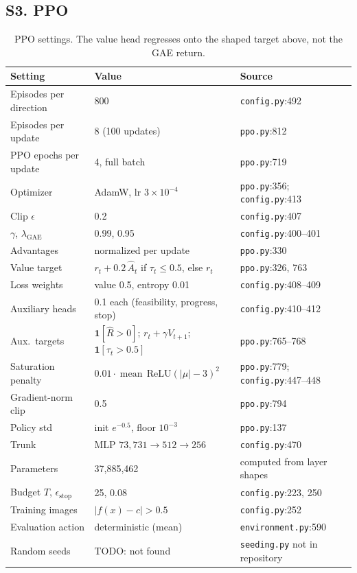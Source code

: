 \subsection*{S3. PPO}

\begin{table}[t]
\centering
\small
\begin{tabular}{@{}lll@{}}
\toprule
Setting & Value & Source \\
\midrule
Episodes per direction & 800 & \texttt{config.py}:492 \\
Episodes per update & 8 (100 updates) & \texttt{ppo.py}:812 \\
PPO epochs per update & 4, full batch & \texttt{ppo.py}:719 \\
Optimizer & AdamW, lr $3\times10^{-4}$ & \texttt{ppo.py}:356; \texttt{config.py}:413 \\
Clip $\epsilon$ & 0.2 & \texttt{config.py}:407 \\
$\gamma$, $\lambda_{\text{GAE}}$ & 0.99, 0.95 & \texttt{config.py}:400--401 \\
Advantages & normalized per update & \texttt{ppo.py}:330 \\
Value target & $r_t + 0.2\,\hat A_t$ if $\tau_t \le 0.5$, else $r_t$ & \texttt{ppo.py}:326, 763 \\
Loss weights & value 0.5, entropy 0.01 & \texttt{config.py}:408--409 \\
Auxiliary heads & 0.1 each (feasibility, progress, stop) & \texttt{config.py}:410--412 \\
Aux.\ targets & $\mathbf{1}[\hat R > 0]$; $r_t + \gamma V_{t+1}$; $\mathbf{1}[\tau_t > 0.5]$ & \texttt{ppo.py}:765--768 \\
Saturation penalty & $0.01 \cdot \operatorname{mean}\,\mathrm{ReLU}(|\mu| - 3)^2$ & \texttt{ppo.py}:779; \texttt{config.py}:447--448 \\
Gradient-norm clip & 0.5 & \texttt{ppo.py}:794 \\
Policy std & init $e^{-0.5}$, floor $10^{-3}$ & \texttt{ppo.py}:137 \\
Trunk & MLP $73{,}731 \to 512 \to 256$ & \texttt{config.py}:470 \\
Parameters & 37{,}885{,}462 & computed from layer shapes \\
Budget $T$, $\epsilon_{\text{stop}}$ & 25, 0.08 & \texttt{config.py}:223, 250 \\
Training images & $|f(x) - c| > 0.5$ & \texttt{config.py}:252 \\
Evaluation action & deterministic (mean) & \texttt{environment.py}:590 \\
Random seeds & TODO: not found & \texttt{seeding.py} not in repository \\
\bottomrule
\end{tabular}
\caption{PPO settings. The value head regresses onto the shaped target above, not the GAE return.}
\end{table}

